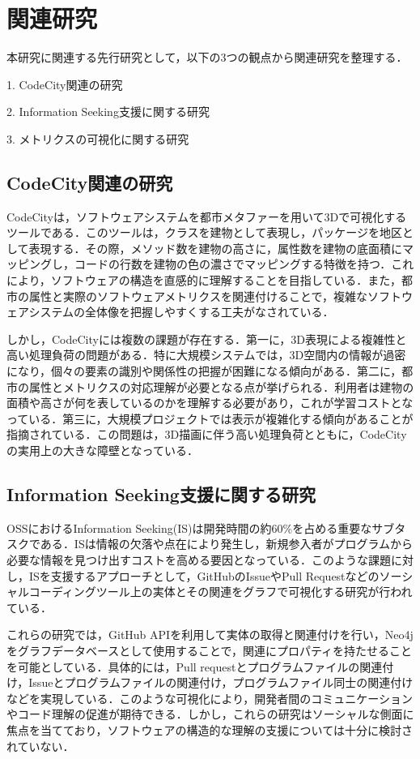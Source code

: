 \documentclass[12pt,twoside]{jbook}
\begin{document}
\chapter{関連研究}
本研究に関連する先行研究として，以下の3つの観点から関連研究を整理する．

1. CodeCity関連の研究

2. Information Seeking支援に関する研究

3. メトリクスの可視化に関する研究

\section{CodeCity関連の研究}
CodeCityは，ソフトウェアシステムを都市メタファーを用いて3Dで可視化するツールである\cite{wettel2011software}．このツールは，クラスを建物として表現し，パッケージを地区として表現する．その際，メソッド数を建物の高さに，属性数を建物の底面積にマッピングし，コードの行数を建物の色の濃さでマッピングする特徴を持つ．これにより，ソフトウェアの構造を直感的に理解することを目指している．また，都市の属性と実際のソフトウェアメトリクスを関連付けることで，複雑なソフトウェアシステムの全体像を把握しやすくする工夫がなされている．

しかし，CodeCityには複数の課題が存在する．第一に，3D表現による複雑性と高い処理負荷の問題がある．特に大規模システムでは，3D空間内の情報が過密になり，個々の要素の識別や関係性の把握が困難になる傾向がある．第二に，都市の属性とメトリクスの対応理解が必要となる点が挙げられる．利用者は建物の面積や高さが何を表しているのかを理解する必要があり，これが学習コストとなっている．第三に，大規模プロジェクトでは表示が複雑化する傾向があることが指摘されている．この問題は，3D描画に伴う高い処理負荷とともに，CodeCityの実用上の大きな障壁となっている．

\section{Information Seeking支援に関する研究}
OSSにおけるInformation Seeking(IS)は開発時間の約60\%を占める重要なサブタスクである\cite{沓澤脩2016中大規模}．ISは情報の欠落や点在により発生し，新規参入者がプログラムから必要な情報を見つけ出すコストを高める要因となっている．このような課題に対し，ISを支援するアプローチとして，GitHubのIssueやPull Requestなどのソーシャルコーディングツール上の実体とその関連をグラフで可視化する研究が行われている．

これらの研究では，GitHub APIを利用して実体の取得と関連付けを行い，Neo4jをグラフデータベースとして使用することで，関連にプロパティを持たせることを可能としている．具体的には，Pull requestとプログラムファイルの関連付け，Issueとプログラムファイルの関連付け，プログラムファイル同士の関連付けなどを実現している．このような可視化により，開発者間のコミュニケーションやコード理解の促進が期待できる．しかし，これらの研究はソーシャルな側面に焦点を当てており，ソフトウェアの構造的な理解の支援については十分に検討されていない．
\end{document}
